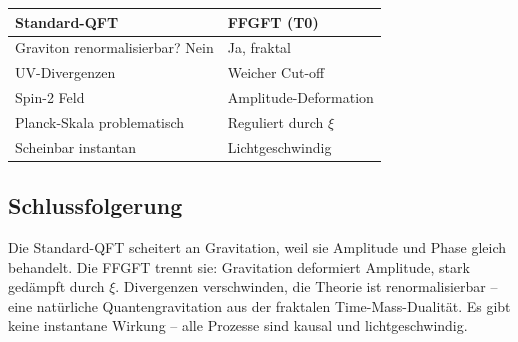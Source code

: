 	\begin{center}
		\begin{tabular}{p{}p{}}
			\textbf{Standard-QFT} & \textbf{FFGFT (T0)} \\
			\hline
			Graviton renormalisierbar? Nein & Ja, fraktal \\
			UV-Divergenzen & Weicher Cut-off \\
			Spin-2 Feld & Amplitude-Deformation \\
			Planck-Skala problematisch & Reguliert durch \(\xi\) \\
			Scheinbar instantan & Lichtgeschwindig \\
		\end{tabular}
	\end{center}
	
	\subsection*{Schlussfolgerung}
	
	Die Standard-QFT scheitert an Gravitation, weil sie Amplitude und Phase gleich behandelt. Die FFGFT trennt sie: Gravitation deformiert Amplitude, stark gedämpft durch \(\xi\). Divergenzen verschwinden, die Theorie ist renormalisierbar – eine natürliche Quantengravitation aus der fraktalen Time-Mass-Dualität. Es gibt keine instantane Wirkung – alle Prozesse sind kausal und lichtgeschwindig.



